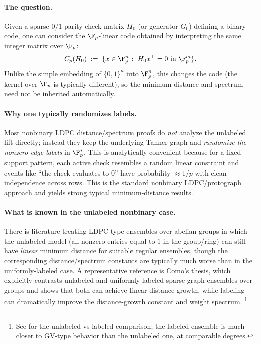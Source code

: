 \paragraph{The question.}
Given a sparse $0/1$ parity-check matrix $H_0$ (or generator $G_0$) defining a binary code, one can consider the
$\F_p$-linear code obtained by interpreting the same integer matrix over $\F_p$:
\[
C_p(H_0)\;:=\;\{x\in \F_p^n:\ H_0 x^\top = 0 \text{ in }\F_p^m\}.
\]
Unlike the simple embedding of $\{0,1\}^n$ into $\F_p^n$, this changes the code (the kernel over $\F_p$ is typically
different), so the minimum distance and spectrum need not be inherited automatically.

\paragraph{Why one typically randomizes labels.}
Most nonbinary LDPC distance/spectrum proofs do \emph{not} analyze the unlabeled lift directly; instead they keep the
underlying Tanner graph and \emph{randomize the nonzero edge labels} in $\F_p^*$.
This is analytically convenient because for a fixed support pattern, each active check resembles a random linear
constraint and events like ``the check evaluates to $0$'' have probability $\approx 1/p$ with clean independence across
rows. This is the standard nonbinary LDPC/protograph approach and yields strong typical minimum-distance results. 

\paragraph{What is known in the unlabeled nonbinary case.}
There is literature treating LDPC-type ensembles over abelian groups in which the unlabeled model (all nonzero entries
equal to $1$ in the group/ring) can still have \emph{linear} minimum distance for suitable regular ensembles, though the
corresponding distance/spectrum constants are typically much worse than in the uniformly-labeled case.
A representative reference is Como's thesis, which explicitly contrasts unlabeled and uniformly-labeled sparse-graph
ensembles over groups and shows that both can achieve linear distance growth, while labeling can dramatically improve the
distance-growth constant and weight spectrum. \cite{ComoThesis} \cite{ComoThesis2}%
\footnote{See \cite{ComoThesis,ComoThesis2} for the unlabeled vs labeled comparison; the labeled ensemble is much closer
to GV-type behavior than the unlabeled one, at comparable degrees.}

